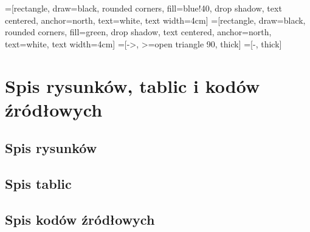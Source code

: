 \documentclass[a4paper,12pt]{article}
\begin{document}
=[rectangle, draw=black, rounded corners, fill=blue!40, drop shadow,
        text centered, anchor=north, text=white, text width=4cm]
=[rectangle, draw=black, rounded corners, fill=green, drop shadow,
        text centered, anchor=north, text=white, text width=4cm]
=[->, >=open triangle 90, thick]
=[-, thick]

\lstset{numbers=left, stepnumber=1, numbersep=10pt, frame=single}
\lstset{frameround=tttt}
\renewcommand{\lstlistlistingname}{\vspace*{-13mm}}
\renewcommand{\listfigurename}{\vspace*{-13mm}}
\renewcommand{\listtablename}{\vspace*{-13mm}}
\renewcommand*{\refname}{\vspace*{-13mm}}
\renewcommand{\lstlistingname}{Kod źródłowy} 


\tableofcontents
{}
\clearpage


\section{Spis rysunków, tablic i kodów źródłowych}
\subsection{Spis rysunków}
\renewcommand*\numberline[1]{Rysunek\,#1:\indent}
\listoffigures
\subsection{Spis tablic}
\renewcommand*\numberline[1]{Tablica\,#1:\indent}
\listoftables
\subsection{Spis kodów źródłowych}
\renewcommand*\numberline[1]{Kod źródłowy\,#1:\indent}
\lstlistoflistings

\end{document}
